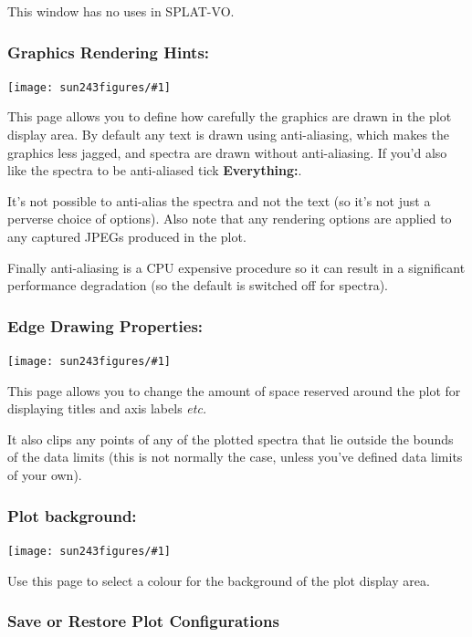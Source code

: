 \documentclass[twoside,11pt]{article}
\newcommand{\htmladdimg}[1]{}
\newcommand{\latexhtml}[2]{#1}
\renewcommand{\_}{\texttt{\symbol{95}}}
\newcommand{\SPLAT}{\textsf{SPLAT-VO}}
\newcommand{\mainfigure}[1]
{\begin{center}
 \latexhtml{\texttt{[image: sun243\_figures/\#1]}}{\htmladdimg{#1.gif}}
 \end{center}
}
\newcommand{\labelitem}[1]{\textbf{#1}}
\newcommand{\etc}{\textit{etc.}}
\begin{document}
This window has no uses in \SPLAT.

\newpage
\subsubsection*{Graphics Rendering Hints:}

\mainfigure{configurewindowrender}

This page allows you to define how carefully the graphics are drawn in the
plot display area. By default any text is drawn using anti-aliasing, which
makes the graphics less jagged, and spectra are drawn without
anti-aliasing. If you'd also like the spectra to be anti-aliased tick
\labelitem{Everything:}.

It's not possible to anti-alias the spectra and not the text (so it's
not just a perverse choice of options). Also note that any rendering
options are applied to any captured JPEGs produced in the plot.

Finally anti-aliasing is a CPU expensive procedure so it can result in
a significant performance degradation (so the default is switched off
for spectra).

\newpage
\subsubsection*{Edge Drawing Properties:}

\mainfigure{configurewindowedges}

This page allows you to change the amount of space reserved around the
plot for displaying titles and axis labels \etc\

It also clips any points of any of the plotted spectra that lie
outside the bounds of the data limits (this is not normally the case,
unless you've defined data limits of your own).

\newpage
\subsubsection*{Plot background:}

\mainfigure{configurewindowbackground}

Use this page to select a colour for the background of the plot
display area.

\newpage
\subsubsection*{Save or Restore Plot Configurations}
\end{document}
